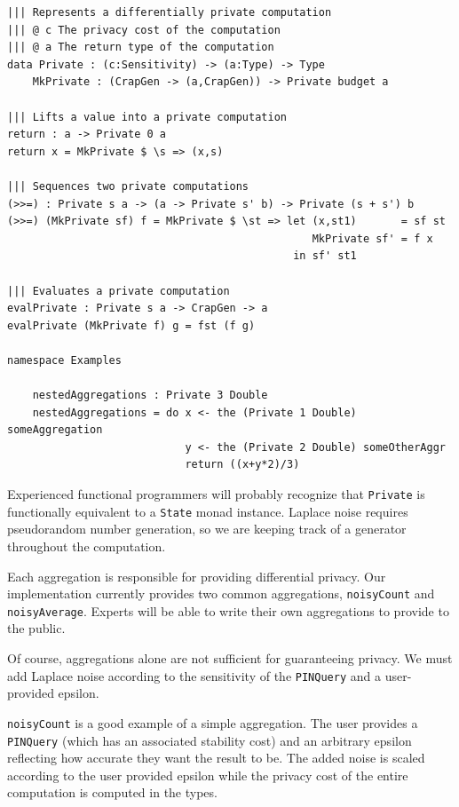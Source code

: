 \documentclass[12pt]{report}
\begin{document}
\begin{lstlisting}[caption={Representing differentially private mechanisms},label={lst:mechanisms}]
||| Represents a differentially private computation
||| @ c The privacy cost of the computation
||| @ a The return type of the computation
data Private : (c:Sensitivity) -> (a:Type) -> Type
    MkPrivate : (CrapGen -> (a,CrapGen)) -> Private budget a

||| Lifts a value into a private computation
return : a -> Private 0 a
return x = MkPrivate $ \s => (x,s)

||| Sequences two private computations
(>>=) : Private s a -> (a -> Private s' b) -> Private (s + s') b
(>>=) (MkPrivate sf) f = MkPrivate $ \st => let (x,st1)       = sf st
                                                MkPrivate sf' = f x
                                             in sf' st1

||| Evaluates a private computation
evalPrivate : Private s a -> CrapGen -> a
evalPrivate (MkPrivate f) g = fst (f g)

namespace Examples

    nestedAggregations : Private 3 Double
    nestedAggregations = do x <- the (Private 1 Double) someAggregation
                            y <- the (Private 2 Double) someOtherAggr
                            return ((x+y*2)/3)
\end{lstlisting}

Experienced functional programmers will probably recognize that \texttt{Private} is functionally equivalent to a \texttt{State} monad instance.
Laplace noise requires pseudorandom number generation, so we are keeping track of a generator throughout the computation.

Each aggregation is responsible for providing differential privacy.
Our implementation currently provides two common aggregations, \texttt{noisyCount} and \texttt{noisyAverage}.
Experts will be able to write their own aggregations to provide to the public.

Of course, aggregations alone are not sufficient for guaranteeing privacy.
We must add Laplace noise according to the sensitivity of the \texttt{PINQuery} and a user-provided epsilon.

\texttt{noisyCount} is a good example of a simple aggregation.
The user provides a \texttt{PINQuery} (which has an associated stability cost) and an arbitrary epsilon reflecting how accurate they want the result to be.
The added noise is scaled according to the user provided epsilon while the privacy cost of the entire computation is computed in the types.
\end{document}
